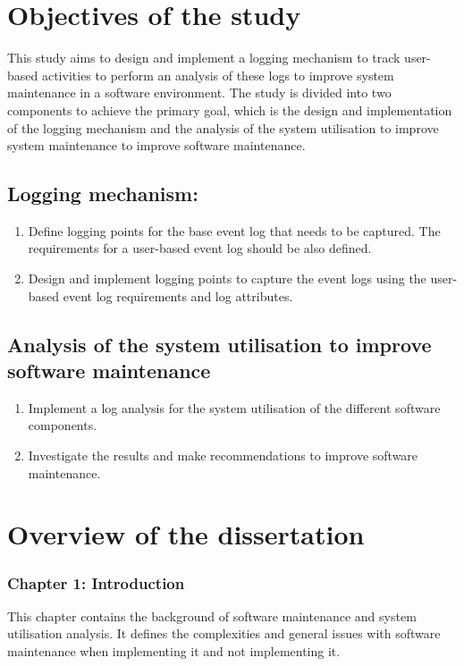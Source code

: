 \section{Objectives of the study}\label{sec:ch1_objectives}
This study aims to design and implement a logging mechanism to track user-based activities to perform an analysis of these logs to improve system maintenance in a software environment. The study is divided into two components to achieve the primary goal, which is the design and implementation of the logging mechanism and the analysis of the system utilisation to improve system maintenance to improve software maintenance.

\subsection{Logging mechanism:}
\begin{enumerate}
	\item Define logging points for the base event log that needs to be captured. The requirements for a user-based event log should be also defined.
	\item Design and implement logging points to capture the event logs using the user-based event log requirements and log attributes.
\end{enumerate}

\subsection{Analysis of the system utilisation to improve software maintenance}
\begin{enumerate}
	\item Implement a log analysis for the system utilisation of the different software components.
	\item Investigate the results and make recommendations to improve software maintenance.
\end{enumerate}

\section{Overview of the dissertation}
\subsubsection{Chapter 1: Introduction}
This chapter contains the background of software maintenance and system utilisation analysis. It defines the complexities and general issues with software maintenance when implementing it and not implementing it.

